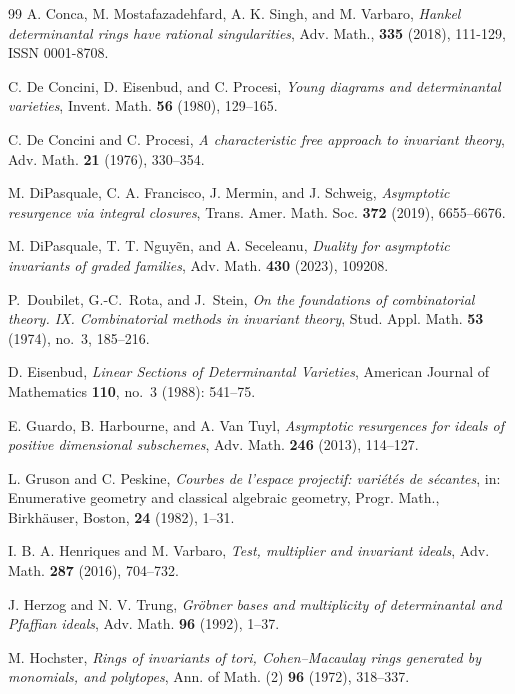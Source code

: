 \documentclass[11pt,reqno]{amsart}
\numberwithin{equation}{subsection}
\theoremstyle{definition}
\theoremstyle{remark}
\begin{document}
\begin{thebibliography}{99}
A. Conca, M. Mostafazadehfard, A. K. Singh, and M. Varbaro,
\emph{Hankel determinantal rings have rational singularities},
Adv. Math., \textbf{335} (2018), 111-129,
ISSN 0001-8708.

C. De Concini, D. Eisenbud, and C. Procesi,
\emph{Young diagrams and determinantal varieties},
Invent. Math. \textbf{56} (1980), 129--165.

C. De Concini and C. Procesi,
\emph{A characteristic free approach to invariant theory},
Adv. Math. \textbf{21} (1976), 330--354.

M. DiPasquale, C. A. Francisco, J. Mermin, and J. Schweig,
\emph{Asymptotic resurgence via integral closures},
Trans. Amer. Math. Soc. \textbf{372} (2019), 6655--6676.

M. DiPasquale, T. T. Nguy{\~e}n, and A. Seceleanu,
\emph{Duality for asymptotic invariants of graded families},
Adv. Math. \textbf{430} (2023), 109208.

P.~Doubilet, G.-C.~Rota, and J.~Stein,
\emph{On the foundations of combinatorial theory. IX. Combinatorial methods in invariant theory},
Stud. Appl. Math. \textbf{53} (1974), no.~3, 185--216.

D. Eisenbud, 
\emph{Linear Sections of Determinantal Varieties},
American Journal of Mathematics \textbf{110}, no.~3 (1988): 541--75.

E. Guardo, B. Harbourne, and A. Van Tuyl,
\emph{Asymptotic resurgences for ideals of positive dimensional subschemes},
Adv. Math. \textbf{246} (2013), 114--127.

L. Gruson and C. Peskine, 
\emph{Courbes de l'espace projectif: vari\'et\'es de s\'ecantes}, 
in: Enumerative geometry and classical algebraic geometry, Progr. Math.,  Birkh\"auser, Boston, \textbf{24} (1982), 
1--31.

I. B. A. Henriques and M. Varbaro,
\emph{Test, multiplier and invariant ideals},
Adv. Math. \textbf{287} (2016), 704--732.

J. Herzog and N. V. Trung,
\emph{Gr\"obner bases and multiplicity of determinantal and Pfaffian ideals},
Adv. Math. \textbf{96} (1992), 1--37.

M. Hochster,
\emph{Rings of invariants of tori, Cohen--Macaulay rings generated by
monomials, and polytopes},
Ann. of Math. (2) \textbf{96} (1972), 318--337.


\end{thebibliography}
\end{document}
